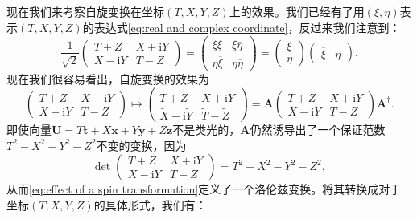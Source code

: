 现在我们来考察自旋变换在坐标$( T,X,Y,Z)$上的效果。我们已经有了用$( \xi ,\eta )$表示$( T,X,Y,Z)$的表达式\ref{eq:real and complex coordinate}，反过来我们注意到：
\begin{equation*}
	\frac{1}{\sqrt{2}}\begin{pmatrix}
		T+Z & X+\mathrm{i} Y\\
		X-\mathrm{i} Y & T-Z
	\end{pmatrix} =\begin{pmatrix}
		\xi \overline{\xi } & \xi \overline{\eta }\\
		\eta \overline{\xi } & \eta \overline{\eta }
	\end{pmatrix} =\begin{pmatrix}
		\xi \\
		\eta 
	\end{pmatrix}\begin{pmatrix}
		\overline{\xi } & \overline{\eta }
	\end{pmatrix} .
\end{equation*}
现在我们很容易看出，自旋变换的效果为
\begin{equation}
	\begin{pmatrix}
		T+Z & X+\mathrm{i} Y\\
		X-\mathrm{i} Y & T-Z
	\end{pmatrix} \mapsto \begin{pmatrix}
		\tilde{T} +\tilde{Z} & \tilde{X} +\mathrm{i}\tilde{Y}\\
		\tilde{X} -\mathrm{i}\tilde{Y} & \tilde{T} -\tilde{Z}
	\end{pmatrix} =\boldsymbol{A}\begin{pmatrix}
		T+Z & X+\mathrm{i} Y\\
		X-\mathrm{i} Y & T-Z
	\end{pmatrix}\boldsymbol{A}^{\dagger } .
	\label{eq:effect of a spin transformation}
\end{equation}
即使向量$\boldsymbol{U} =T\boldsymbol{t} +X\boldsymbol{x} +Y\boldsymbol{y} +Z\boldsymbol{z}$不是类光的，$\boldsymbol{A}$仍然诱导出了一个保证范数$T^{2} -X^{2} -Y^{2} -Z^{2}$不变的变换，因为
\begin{equation*}
	\det\begin{pmatrix}
		T+Z & X+\mathrm{i} Y\\
		X-\mathrm{i} Y & T-Z
	\end{pmatrix} =T^{2} -X^{2} -Y^{2} -Z^{2} ,
\end{equation*}
从而\ref{eq:effect of a spin transformation}定义了一个洛伦兹变换。将其转换成对于坐标$( T,X,Y,Z)$的具体形式，我们有：
